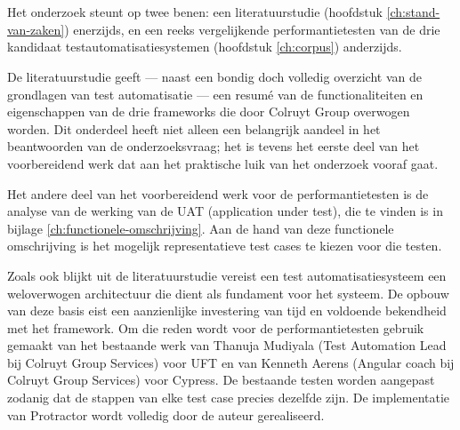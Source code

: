 
\chapter{}
\label{ch:methodologie}


Het onderzoek steunt op twee benen: een literatuurstudie (hoofdstuk \ref{ch:stand-van-zaken}) enerzijds, en een reeks vergelijkende performantietesten van de drie kandidaat testautomatisatiesystemen (hoofdstuk \ref{ch:corpus}) anderzijds.

De literatuurstudie geeft — naast een bondig doch volledig overzicht van de grondlagen van test automatisatie — een resumé van de functionaliteiten en eigenschappen van de drie frameworks die door Colruyt Group overwogen worden. Dit onderdeel heeft niet alleen een belangrijk aandeel in het beantwoorden van de onderzoeksvraag; het is tevens het eerste deel van het voorbereidend werk dat aan het praktische luik van het onderzoek vooraf gaat.


Het andere deel van het voorbereidend werk voor de performantietesten is de analyse van de werking van de UAT (application under test), die te vinden is in bijlage \ref{ch:functionele-omschrijving}. Aan de hand van deze functionele omschrijving is het mogelijk representatieve test cases te kiezen voor die testen.

Zoals ook blijkt uit de literatuurstudie vereist een test automatisatiesysteem een weloverwogen architectuur die dient als fundament voor het systeem. De opbouw van deze basis eist een aanzienlijke investering van tijd en voldoende bekendheid met het framework. Om die reden wordt voor de performantietesten gebruik gemaakt van het bestaande werk van Thanuja Mudiyala (Test Automation Lead bij Colruyt Group Services) voor UFT en van Kenneth Aerens (Angular coach bij Colruyt Group Services) voor Cypress. De bestaande testen worden aangepast zodanig dat de stappen van elke test case precies dezelfde zijn. De implementatie van Protractor wordt volledig door de auteur gerealiseerd.

